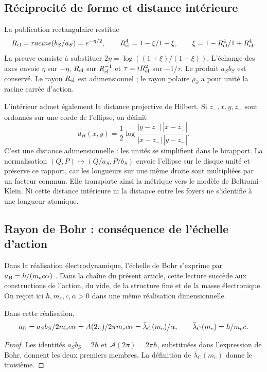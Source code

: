 \subsection{Réciprocité de forme et distance intérieure}

La publication rectangulaire restitue
\begin{equation}
 R_{\rm el}=\sqrt{b_S/a_S}=e^{-\eta/2},\qquad
 R_{\rm el}^4=\frac{1-\xi}{1+\xi},\qquad
 \xi=\frac{1-R_{\rm el}^4}{1+R_{\rm el}^4}.
 \label{ii:eq:ii-elipse-reciproca}
\end{equation}
La preuve consiste à substituer
\(2\eta=\log((1+\xi)/(1-\xi))\). L'échange des axes
envoie \(\eta\) sur \(-\eta\), \(R_{\rm el}\) sur
\(R_{\rm el}^{-1}\) et \(\tau=iR_{\rm el}^2\) sur \(-1/\tau\).
Le produit \(a_Sb_S\) est conservé. Le rayon \(R_{\rm el}\) est adimensionnel ;
le rayon polaire \(\rho_{\partial}\) a pour unité la racine carrée d'action.

L'intérieur admet également la distance projective de Hilbert. Si
\(z_-,x,y,z_+\) sont ordonnés sur une corde de l'ellipse, on définit
\[
 d_H(x,y)=\frac12\log
 \frac{|y-z_-|\,|x-z_+|}{|x-z_-|\,|y-z_+|}.
\]
C'est une distance adimensionnelle : les unités se simplifient dans le birapport.
La normalisation \((Q,P)\mapsto(Q/a_S,P/b_S)\) envoie l'ellipse
sur le disque unité et préserve ce rapport, car les longueurs sur une
même droite sont multipliées par un facteur commun. Elle transporte ainsi la métrique
vers le modèle de Beltrami--Klein. Ni cette distance intérieure ni la distance
entre les foyers ne s'identifie à une longueur atomique.

\subsection{Rayon de Bohr : conséquence de l'échelle d'action}
\label{ii:sec:ii-elipse-bohr}

Dans la réalisation électrodynamique, l'échelle de Bohr s'exprime par
\(a_{\rm B}=\hbar/(m_ec\alpha)\) \cite{ii:codata2022}. Dans la chaîne
du présent article, cette lecture succède aux constructions de
l'action, du vide, de la structure fine et de la masse électronique. On reçoit ici
\(\hbar,m_e,c,\alpha>0\) dans une même réalisation dimensionnelle.
\begin{proposition}
\label{ii:prop:ii-elipse-bohr}
Dans cette réalisation,
\begin{equation}
 a_{\rm B}=\frac{a_Sb_S}{2m_ec\alpha}
 =\frac{\mathcal A(2\pi)}{2\pi m_ec\alpha}
 =\frac{\bar\lambda_C(m_e)}{\alpha},\qquad
 \bar\lambda_C(m_e)=\frac{\hbar}{m_ec}.
 \label{ii:eq:ii-elipse-bohr}
\end{equation}
\end{proposition}
\begin{proof}
Les identités \(a_Sb_S=2\hbar\) et
\(\mathcal A(2\pi)=2\pi\hbar\), substituées dans l'expression
de Bohr, donnent les deux premiers membres. La définition de
\(\bar\lambda_C(m_e)\) donne le troisième.
\end{proof}

